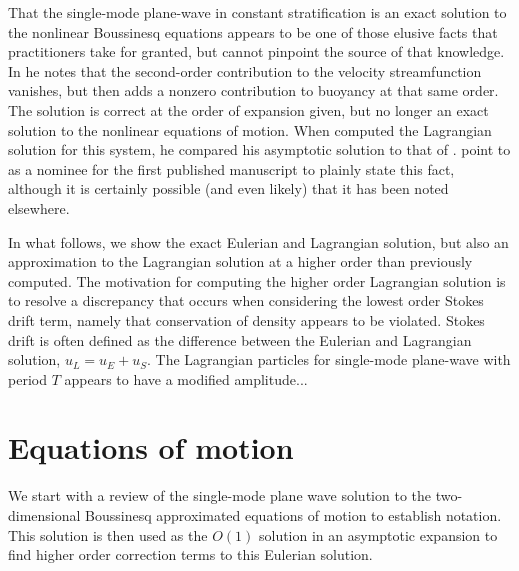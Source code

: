 \documentclass{jfm}
\begin{document}
That the single-mode plane-wave in constant stratification is an exact solution to the nonlinear Boussinesq equations appears to be one of those elusive facts that practitioners take for granted, but cannot pinpoint the source of that knowledge. In \citet{thorpe1968} he notes that the second-order contribution to the velocity streamfunction vanishes, but then adds a nonzero contribution to buoyancy at that same order. The solution is correct at the order of expansion given, but no longer an exact solution to the nonlinear equations of motion. When \citet{Sanderson1985-jfm} computed the Lagrangian solution for this system, he compared his asymptotic solution to that of \citet{thorpe1968}. \citet{diamessis2014-dao} point to \citet{tabaei2005-jfm} as a nominee for the first published manuscript to plainly state this fact, although it is certainly possible (and even likely) that it has been noted elsewhere.

In what follows, we show the exact Eulerian and Lagrangian solution, but also an approximation to the Lagrangian solution at a higher order than previously computed. The motivation for computing the higher order Lagrangian solution is to resolve a discrepancy that occurs when considering the lowest order Stokes drift term, namely that conservation of density appears to be violated. Stokes drift is often defined as the difference between the Eulerian and Lagrangian solution, $u_L = u_E + u_S$. The Lagrangian particles for single-mode plane-wave with period $T$ appears to have a modified amplitude...

%
\section{Equations of motion}
%

We start with a review of the single-mode plane wave solution to the two-dimensional Boussinesq approximated equations of motion to establish notation. This solution is then used as the $O(1)$ solution in an asymptotic expansion to find higher order correction terms to this Eulerian solution.
\end{document}

